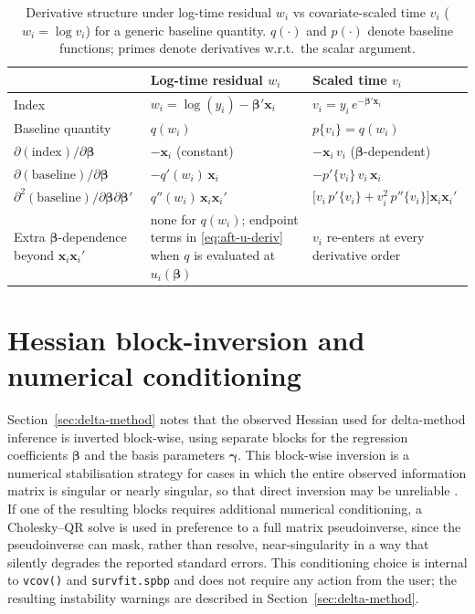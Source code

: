 \documentclass[5p,lefttitle]{elsarticle}
\begin{document}
{\begin{table}[!h]
\footnotesize
\centering
\caption{\label{tab:aft-deriv-compare} Derivative structure under log-time residual \(w_i\) vs covariate-scaled time \(v_i\) (\(w_i=\log v_i\)) for a generic baseline quantity. \(q(\cdot)\) and \(p(\cdot)\) denote baseline functions; primes denote derivatives w.r.t.\ the scalar argument.}
\begin{tabularx}{\columnwidth}{%
>{\raggedright\arraybackslash}p{}
>{\raggedright\arraybackslash}X
>{\raggedright\arraybackslash}X}
\toprule
 & Log-time residual \(w_i\) & Scaled time \(v_i\) \\
\midrule
Index &
\(w_i=\log(y_i)-\boldsymbol{\beta}'\boldsymbol{x}_i\) &
\(v_i=y_i\,e^{-\boldsymbol{\beta}'\boldsymbol{x}_i}\)
\\[0.7em]
Baseline quantity &
\(q(w_i)\) &
\(p\{v_i\}=q(w_i)\)
\\[0.7em]
\(\partial(\text{index})/\partial\boldsymbol{\beta}\) &
\(-\boldsymbol{x}_i\) (constant) &
\(-\boldsymbol{x}_i\,v_i\) (\(\boldsymbol{\beta}\)-dependent)
\\[0.7em]
\(\partial(\text{baseline})/\partial\boldsymbol{\beta}\) &
\(-q'(w_i)\,\boldsymbol{x}_i\) &
\(-p'\{v_i\}\,v_i\,\boldsymbol{x}_i\)
\\[0.7em]
\(\partial^2(\text{baseline})/\partial\boldsymbol{\beta}\partial\boldsymbol{\beta}'\) &
\(q''(w_i)\,\boldsymbol{x}_i\boldsymbol{x}_i'\) &
\(\bigl[v_i\,p'\{v_i\}+v_i^2\,p''\{v_i\}\bigr]\boldsymbol{x}_i\boldsymbol{x}_i'\)
\\[0.7em]
Extra \(\boldsymbol{\beta}\)-dependence beyond
\(\boldsymbol{x}_i\boldsymbol{x}_i'\) &
none for \(q(w_i)\); endpoint terms in \eqref{eq:aft-u-deriv} when \(q\) is evaluated at \(u_i(\boldsymbol{\beta})\) &
\(v_i\) re-enters at every derivative order
\\
\bottomrule
\end{tabularx}
\end{table}

\section{Hessian block-inversion and numerical conditioning}\label{app:hessian-blocks}

Section~\ref{sec:delta-method} notes that the observed Hessian used for
delta-method inference is inverted block-wise, using separate blocks for
the regression coefficients \(\boldsymbol{\beta}\) and the basis parameters
\(\boldsymbol{\gamma}\). This block-wise inversion is a numerical
stabilisation strategy for cases in which the entire observed information
matrix is singular or nearly singular, so that direct inversion may be
unreliable \citep{nocedal2006numerical}. If one of the resulting blocks
requires additional numerical conditioning, a Cholesky--QR solve is used
in preference to a full matrix pseudoinverse, since the pseudoinverse can
mask, rather than resolve, near-singularity in a way that silently
degrades the reported standard errors. This conditioning choice is
internal to \texttt{vcov()} and \texttt{survfit.spbp} and does not require
any action from the user; the resulting instability warnings are described
in Section~\ref{sec:delta-method}.

}
\end{document}
